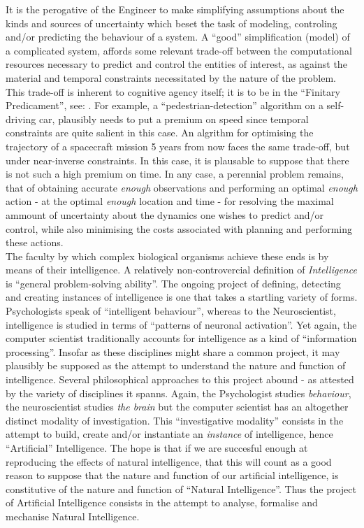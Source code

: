 \documentclass[12pt, twoside]{report}
\begin{document}
It is the perogative of the Engineer to make simplifying assumptions about the kinds and sources of uncertainty which beset the task of modeling, controling and/or predicting the behaviour of a system. A ``good'' simplification (model) of a complicated system, affords some relevant trade-off between the computational resources necessary to predict and control the entities of interest, as against the material and temporal constraints necessitated by the nature of the problem. This trade-off is inherent to cognitive agency itself; it is to be in the ``Finitary Predicament'', see: \textcite{Cherniak}. For example, a ``pedestrian-detection'' algorithm on a self-driving car, plausibly needs to put a premium on speed since temporal constraints are quite salient in this case. An algrithm for optimising the trajectory of a spacecraft mission 5 years from now faces the same trade-off, but under near-inverse constraints. In this case, it is plausable to suppose that there is not such a high premium on time. In any case, a perennial problem remains, that of obtaining accurate \textit{enough} observations and performing an optimal \textit{enough} action - at the optimal \textit{enough} location and time - for resolving the maximal ammount of uncertainty about the dynamics one wishes to predict and/or control, while also minimising the costs associated with planning and performing these actions.  
\\    

The faculty by which complex biological organisms achieve these ends is by means of their intelligence. A relatively non-controvercial definition of \textit{Intelligence} is ``general problem-solving ability''. The ongoing project of defining, detecting and creating instances of intelligence is one that takes a startling variety of forms. Psychologists speak of ``intelligent behaviour'', whereas to the Neuroscientist, intelligence is studied in terms of ``patterns of neuronal activation''. Yet again, the computer scientist traditionally accounts for intelligence as a kind of ``information processing''. Insofar as these disciplines might share a common project, it may plausibly be supposed as the attempt to understand the nature and function of intelligence. Several philosophical approaches to this project abound - as attested by the variety of disciplines it spanns. Again, the Psychologist studies \textit{behaviour}, the neuroscientist studies \textit{the brain} but the computer scientist has an altogether distinct modality of investigation. This ``investigative modality'' consists in the attempt to build, create and/or instantiate an \textit{instance} of intelligence, hence ``Artificial'' Intelligence. The hope is that if we are succesful enough at reproducing the effects of natural intelligence, that this will count as a good reason to suppose that the nature and function of our artificial intelligence, is constitutive of the nature and function of ``Natural Intelligence''. Thus the project of Artificial Intelligence consists in the attempt to analyse, formalise and mechanise Natural Intelligence. 
\\
\end{document}

